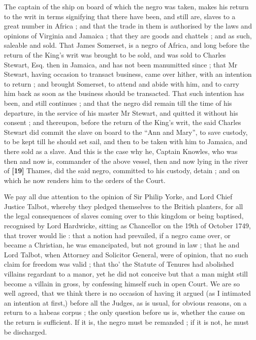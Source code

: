 \documentclass[a4paper]{article}
\begin{document}
The captain of the ship on board of which the negro was taken, makes his return to the writ in terms signifying that there have been, and still are, slaves to a great number in Africa ; and that the trade in them is authorised by the laws and opinions of Virginia and Jamaica ; that they are goods and chattels ; and as such, saleable and sold. That James Somerset, is a negro of Africa, and long before the return of the King's writ was brought to be sold, and was sold to Charles Stewart, Esq. then in Jamaica, and has not been manumitted since ; that Mr Stewart, having occasion to transact business, came over hither, with an intention to return ; and brought Somerset, to attend and abide with him, and to carry him back as soon as the business should be transacted. That such intention has been, and still continues ; and that the negro did remain till the time of his departure, in the service of his master Mr Stewart, and quitted it without his consent ; and thereupon, before the return of the King's writ, the said Charles Stewart did commit the slave on board to the ``Ann and Mary'', to save custody, to be kept till he should set sail, and then to be taken with him to Jamaica, and there sold as a slave. And this is the case why he, Captain Knowles, who was then and now is, commander of the above vessel, then and now lying in the river of \textbf{[19]} Thames, did the said negro, committed to his custody, detain ; and on which he now renders him to the orders of the Court. 

We pay all due attention to the opinion of Sir Philip Yorke, and Lord Chief Justice Talbot, whereby they pledged themselves to the British planters, for all the legal consequences of slaves coming over to this kingdom or being baptised, recognised by Lord Hardwicke, sitting as Chancellor on the 19th of October 1749, that trover would lie : that a notion had prevailed, if a negro came over, or became a Christian, he was emancipated, but not ground in law ; that he and Lord Talbot, when Attorney and Solicitor General, were of opinion, that no such claim for freedom was valid ; that tho' the Statute of Tenures had abolished villains regardant to a manor, yet he did not conceive but that a man might still become a villain in gross, by confessing himself such in open Court. We are so well agreed, that we think there is no occasion of having it argued (as I intimated an intention at first,) before all the Judges, as is usual, for obvious reasons, on a return to a habeas corpus ; the only question before us is, whether the cause on the return is sufficient. If it is, the negro must be remanded ; if it is not, he must be discharged. 
\end{document}
